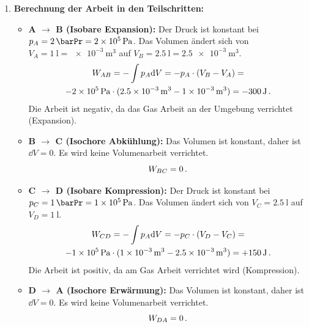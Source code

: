 \documentclass[ngerman]{scrreprt}
\newenvironment{loesungbox}[1]
  {\needspace{5\baselineskip}\begin{loesungboxstyle}[frametitle={#1}]}
  {\end{loesungboxstyle}}
\begin{document}
\begin{loesungbox}{Lösung zu \Cref{aufg:volumenarbeit}}
\begin{enumerate}
    \item \textbf{Berechnung der Arbeit in den Teilschritten:}
    \begin{itemize}
        \item \textbf{A $\rightarrow$ B (Isobare Expansion):}
        Der Druck ist konstant bei $p_A = \SI{2}{\barPr} = \SI{2e5}{\pascal}$. Das Volumen ändert sich von $V_A = \SI{1}{\litre} = \SI{e-3}{\meter\cubed}$ auf $V_B = \SI{2.5}{\litre} = \SI{2.5e-3}{\meter\cubed}$.
        \begin{multline}
            W_{AB} = -\int p_A \mathrm{d} V = -p_A \cdot (V_B - V_A) = \\ -\SI{2e5}{\pascal} \cdot (\SI{2.5e-3} {\meter\cubed} - \SI{1e-3}{\meter\cubed}) = -\SI{300}{\joule} \,.
        \end{multline}
        Die Arbeit ist negativ, da das Gas Arbeit an der Umgebung verrichtet (Expansion).
        
        \item \textbf{B $\rightarrow$ C (Isochore Abkühlung):}
        Das Volumen ist konstant, daher ist $\dd V = 0$. Es wird keine Volumenarbeit verrichtet.
        \begin{equation}
            W_{BC} = 0 \,.
        \end{equation}
        
        \item \textbf{C $\rightarrow$ D (Isobare Kompression):}
        Der Druck ist konstant bei $p_C = \SI{1}{\barPr} = \SI{1e5}{\pascal}$. Das Volumen ändert sich von $V_C = \SI{2.5}{\litre}$ auf $V_D = \SI{1}{\litre}$.
        \begin{multline}
            W_{CD} = -\int p_A \mathrm{d} V = -p_C \cdot (V_D - V_C) =\\
            -\SI{1e5}{\pascal} \cdot (\SI{1e-3}{\meter\cubed} - \SI{2.5e-3}{\meter\cubed}) = +\SI{150}{\joule} \,.
        \end{multline}
        Die Arbeit ist positiv, da am Gas Arbeit verrichtet wird (Kompression).
        
        \item \textbf{D $\rightarrow$ A (Isochore Erwärmung):}
        Das Volumen ist konstant, daher ist $\dd V = 0$. Es wird keine Volumenarbeit verrichtet.
        \begin{equation}
            W_{DA} = 0 \,.
        \end{equation}
    \end{itemize}
    

\end{enumerate}
\end{loesungbox}
\end{document}
